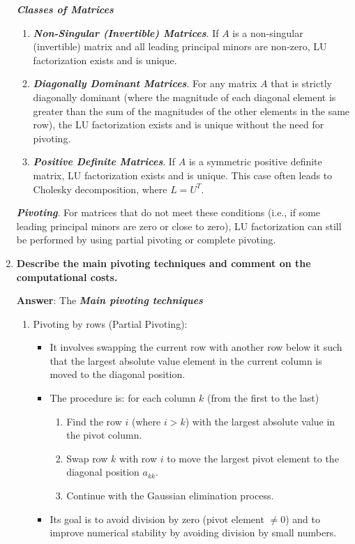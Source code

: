 \begin{enumerate}[label=\textcolor{Green3}{\textbf{\arabic*.}}]
    \textbf{\emph{Classes of Matrices}}
    \begin{enumerate}
        \item \textbf{\emph{Non-Singular (Invertible) Matrices}}. If $A$ is a non-singular (invertible) matrix and all leading principal minors are non-zero, LU factorization exists and is unique.
        \item \textbf{\emph{Diagonally Dominant Matrices}}. For any matrix $A$ that is strictly diagonally dominant (where the magnitude of each diagonal element is greater than the sum of the magnitudes of the other elements in the same row), the LU factorization exists and is unique without the need for pivoting.
        \item \textbf{\emph{Positive Definite Matrices}}. If $A$ is a symmetric positive definite matrix, LU factorization exists and is unique. This case often leads to Cholesky decomposition, where $L = U^T$.
    \end{enumerate}
    
    \textbf{\emph{Pivoting}}. For matrices that do not meet these conditions (i.e., if some leading principal minors are zero or close to zero), LU factorization can still be performed by using partial pivoting or complete pivoting.


    \newpage

    \item \textcolor{Green3}{\textbf{%
        Describe the main pivoting techniques and comment on the computational costs.
    }}

    \textbf{Answer}: The \textbf{\emph{Main pivoting techniques}}
    \begin{enumerate}
        \item Pivoting by rows (Partial Pivoting):
        \begin{itemize}
            \item It involves swapping the current row with another row below it such that the largest absolute value element in the current column is moved to the diagonal position.
            \item The procedure is: for each column $k$ (from the first to the last)
            \begin{enumerate}
                \item Find the row $i$ (where $i>k$) with the largest absolute value in the pivot column.
                \item Swap row $k$ with row $i$ to move the largest pivot element to the diagonal position $a_{kk}$.
                \item Continue with the Gaussian elimination process.
            \end{enumerate}
            \item Its goal is to avoid division by zero (pivot element $\ne 0$) and to improve numerical stability by avoiding division by small numbers.
        \end{itemize}


\end{enumerate}
\end{enumerate}
